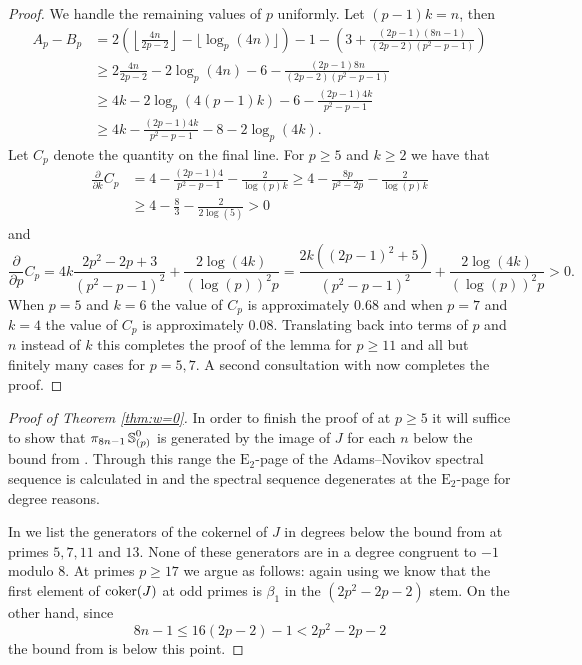 \begin{proof}
  We handle the remaining values of $p$ uniformly.
  Let $(p-1)k = n$, then
  \begin{align*}
    A_p - B_p &= 2 \left( \left\lfloor \frac{4n}{2p-2} \right\rfloor - \lfloor \log_{p}(4n) \rfloor \right) - 1 - \left( 3 + \frac{(2p-1)(8n-1)}{(2p-2)(p^2-p-1)} \right) \\
    &\geq 2 \frac{4n}{2p-2} - 2\log_{p}(4n) - 6 - \frac{(2p-1)8n}{(2p-2)(p^2-p-1)} \\
    &\geq 4k - 2\log_{p}(4(p-1)k) - 6 - \frac{(2p-1)4k}{p^2 - p - 1} \\
    &\geq 4k - \frac{(2p-1)4k}{p^2 - p - 1} - 8 - 2\log_{p}(4k). 
  \end{align*}
  Let $C_p$ denote the quantity on the final line.
  For $p \geq 5$ and $k \geq 2$ we have that
  \begin{align*}
    \frac{\partial}{\partial k} C_p
    &= 4 - \frac{(2p-1)4}{p^2 - p - 1} - \frac{2}{\log(p) k} \geq 4 - \frac{8p}{p^2 - 2p} - \frac{2}{\log(p) k} \\
    &\geq 4 - \frac{8}{3} - \frac{2}{2\log(5)} > 0
  \end{align*}  
  and
  \[ \frac{\partial}{\partial p} C_p = 4k\frac{2p^2 - 2p + 3}{(p^2 - p - 1)^2} + \frac{2\log(4k)}{(\log(p))^2 p} = \frac{2k((2p - 1)^2 + 5)}{(p^2 - p - 1)^2} + \frac{2\log(4k)}{(\log(p))^2 p}> 0. \]
  When $p=5$ and $k=6$ the value of $C_p$ is approximately $0.68$ and
  when $p=7$ and $k=4$ the value of $C_p$ is approximately $0.08$.
  Translating back into terms of $p$ and $n$ instead of $k$ this completes the proof of the lemma for $p \geq 11$ and all but finitely many cases for $p=5,7$. 
  A second consultation with  now completes the proof.
\end{proof}

\begin{proof}[Proof of Theorem \ref{thm:w=0}]
  
  In order to finish the proof of  at $p\geq 5$ it will suffice to show that $\pi_{8n-1}\operatorname{\mathbb{S}}^0_{(p)}$ is generated by the image of $J$ for each $n$ below the bound from .
  Through this range the $\mathrm{E}_2$-page of the Adams--Novikov spectral sequence is calculated in \cite[Theorem 4.4.20]{GreenBook} and the spectral sequence degenerates at the $\mathrm{E}_2$-page for degree reasons.

  In  we list the generators of the cokernel of $J$ in degrees below the bound from  at primes $5,7,11$ and $13$.
  None of these generators are in a degree congruent to $-1$ modulo 8.
  At primes $p \geq 17$ we argue as follows:
  again using \cite[Theorem 4.4.20]{GreenBook} we know that the first element of $\operatorname{\mathrm{coker}}(J)$ at odd primes is $\beta_1$ in the $(2p^2 - 2p -2)$ stem.
  On the other hand, since
  \[8n-1 \leq 16(2p-2) - 1 < 2p^2 - 2p - 2 \]
  the bound from  is below this point.
\end{proof}
  
